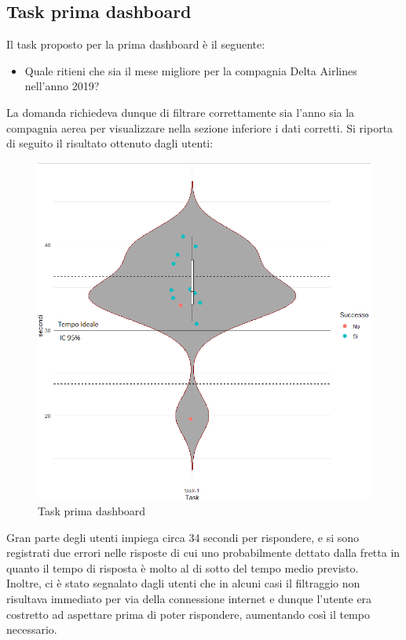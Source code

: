 \documentclass[12pt]{article}
\begin{document}
\subsection{Task prima dashboard}
Il task proposto per la prima dashboard è il seguente:
\begin{itemize}
    \item Quale ritieni che sia il mese migliore per la compagnia Delta Airlines nell'anno 2019?
\end{itemize}
La domanda richiedeva dunque di filtrare correttamente sia l'anno sia la compagnia aerea per visualizzare nella sezione inferiore i dati corretti. Si riporta di seguito il risultato ottenuto dagli utenti:
\begin{figure}[H]
    \centering
    \includegraphics[scale = 0.5]{img/task/Dash1_task.png}
    \caption{Task prima dashboard}
\end{figure}
\noindent Gran parte degli utenti impiega circa 34 secondi per rispondere, e si sono registrati due errori nelle risposte di cui uno probabilmente dettato dalla fretta in quanto il tempo di risposta è molto al di sotto del tempo medio previsto.\\
Inoltre, ci è stato segnalato dagli utenti che in alcuni casi il filtraggio non risultava immediato per via della connessione internet e dunque l'utente era costretto ad aspettare prima di poter rispondere, aumentando così il tempo necessario.\\
\end{document}

